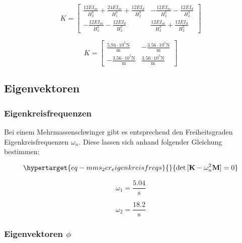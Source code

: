 \documentclass[
  letterpaper,
  DIV=11]{scrreprt}
\begin{document}
\begin{equation}K = \left[\begin{matrix}\frac{12 EI_{ac}}{H_{2}^{3}} + \frac{24 EI_{ac}}{H_{1}^{3}} + \frac{12 EI_{d}}{H_{2}^{3}} & - \frac{12 EI_{ac}}{H_{2}^{3}} - \frac{12 EI_{d}}{H_{2}^{3}}\\- \frac{12 EI_{ac}}{H_{2}^{3}} - \frac{12 EI_{d}}{H_{2}^{3}} & \frac{12 EI_{ac}}{H_{2}^{3}} + \frac{12 EI_{d}}{H_{2}^{3}}\end{matrix}\right]\end{equation}

\begin{equation}K = \left[\begin{matrix}\frac{5.94 \cdot 10^{5} \text{N}}{\text{m}} & - \frac{3.56 \cdot 10^{5} \text{N}}{\text{m}}\\- \frac{3.56 \cdot 10^{5} \text{N}}{\text{m}} & \frac{3.56 \cdot 10^{5} \text{N}}{\text{m}}\end{matrix}\right]\end{equation}

\hypertarget{eigenvektoren-5}{%
\subsection{Eigenvektoren}\label{eigenvektoren-5}}

\hypertarget{eigenkreisfrequenzen-6}{%
\subsubsection{Eigenkreisfrequenzen}\label{eigenkreisfrequenzen-6}}

Bei einem Mehrmassenschwinger gibt es entsprechend den Freiheitsgraden
Eigenkreisfrequenzen \(\omega_n\). Diese lassen sich anhand folgender
Gleichung bestimmen:

\begin{equation}\protect\hypertarget{eq-mms_2er_eigenkreisfreqs}{}{
\det{[\mathbf{K}-\omega_n^2 \mathbf{M}]=0}
}\label{eq-mms_2er_eigenkreisfreqs}\end{equation}

\begin{equation}\omega_{1} = \frac{5.04}{\text{s}}\end{equation}

\begin{equation}\omega_{2} = \frac{18.2}{\text{s}}\end{equation}

\hypertarget{eigenvektoren-phi-4}{%
\subsubsection{\texorpdfstring{Eigenvektoren
\(\phi\)}{Eigenvektoren \textbackslash phi}}\label{eigenvektoren-phi-4}}
\end{document}
